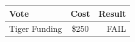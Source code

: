 \documentclass[9pt]{extarticle} %
\begin{document}
\begin{minipage}[t]{.30\linewidth}
\begin{mdframed}[style=sidebar,frametitle={}]

\begin{tabular}{lcr}

Vote & Cost & Result \\
\midrule
Tiger Funding & \$250 & FAIL \\
\bottomrule
\end{tabular}


\end{mdframed}
\end{minipage}\hfill %
%
%
\end{document}

